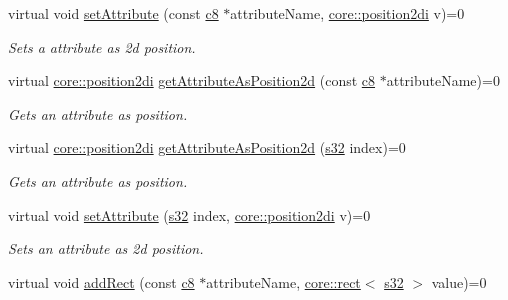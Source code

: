 \begin{DoxyCompactItemize}
virtual void \hyperlink{classirr_1_1io_1_1IAttributes_abd4c30bfab5a3755682b9fc902b04310}{set\+Attribute} (const \hyperlink{namespaceirr_a9395eaea339bcb546b319e9c96bf7410}{c8} $\ast$attribute\+Name, \hyperlink{namespaceirr_1_1core_a3643c2cc7820dd78cd87e73a46b92145}{core\+::position2di} v)=0
\begin{DoxyCompactList}\small\item\em Sets a attribute as 2d position. \end{DoxyCompactList}\item 
virtual \hyperlink{namespaceirr_1_1core_a3643c2cc7820dd78cd87e73a46b92145}{core\+::position2di} \hyperlink{classirr_1_1io_1_1IAttributes_abedde01b678c482be20735e4d730942f}{get\+Attribute\+As\+Position2d} (const \hyperlink{namespaceirr_a9395eaea339bcb546b319e9c96bf7410}{c8} $\ast$attribute\+Name)=0
\begin{DoxyCompactList}\small\item\em Gets an attribute as position. \end{DoxyCompactList}\item 
virtual \hyperlink{namespaceirr_1_1core_a3643c2cc7820dd78cd87e73a46b92145}{core\+::position2di} \hyperlink{classirr_1_1io_1_1IAttributes_a11afd9cf70fb04706e26ef15a3423d9a}{get\+Attribute\+As\+Position2d} (\hyperlink{namespaceirr_ac66849b7a6ed16e30ebede579f9b47c6}{s32} index)=0
\begin{DoxyCompactList}\small\item\em Gets an attribute as position. \end{DoxyCompactList}\item 
\mbox{\label{classirr_1_1io_1_1IAttributes_a164e65ef2719645ee55d263f98d67530}} 
virtual void \hyperlink{classirr_1_1io_1_1IAttributes_a164e65ef2719645ee55d263f98d67530}{set\+Attribute} (\hyperlink{namespaceirr_ac66849b7a6ed16e30ebede579f9b47c6}{s32} index, \hyperlink{namespaceirr_1_1core_a3643c2cc7820dd78cd87e73a46b92145}{core\+::position2di} v)=0
\begin{DoxyCompactList}\small\item\em Sets an attribute as 2d position. \end{DoxyCompactList}\item 
\mbox{\label{classirr_1_1io_1_1IAttributes_ab96f842013ac61bb75a460c073d90c57}} 
virtual void \hyperlink{classirr_1_1io_1_1IAttributes_ab96f842013ac61bb75a460c073d90c57}{add\+Rect} (const \hyperlink{namespaceirr_a9395eaea339bcb546b319e9c96bf7410}{c8} $\ast$attribute\+Name, \hyperlink{classirr_1_1core_1_1rect}{core\+::rect}$<$ \hyperlink{namespaceirr_ac66849b7a6ed16e30ebede579f9b47c6}{s32} $>$ value)=0

\end{DoxyCompactItemize}
